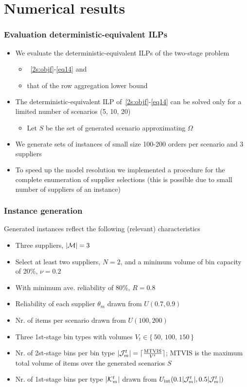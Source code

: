 \documentclass[9pt,xcolor={dvipsnames}]{beamer}
\begin{document}
\section {Numerical results}
\begin{frame}[allowframebreaks]
	\frametitle{Evaluation deterministic-equivalent ILPs}
	\begin{itemize}
		\item We evaluate the deterministic-equivalent ILPs of the two-stage problem
		\begin{itemize}
			\item~\eqref{2s:objf}-\eqref{eq14} and
			\item that of the row aggregation lower bound
		\end{itemize}
		\bigskip
		\item The deterministic-equivalent ILP of~\eqref{2s:objf}-\eqref{eq14} can be solved only for a limited number of scenarios (5, 10, 20)
		\begin{itemize}
			\footnotesize
			\item Let $ S$ be the set of generated scenario approximating $\Omega$
		\end{itemize}
		\bigskip
		\item We generate sets of instances of small size 100-200 orders per scenario and 3 suppliers
		\bigskip
		\item To speed up the model resolution we implemented a procedure for the complete enumeration of supplier selections (this is possible due to small number of suppliers of an instance)
	\end{itemize}
\end{frame}

\begin{frame}[allowframebreaks]
	\frametitle{Instance generation}
	Generated instances reflect the following (relevant) characteristics
	\begin{itemize}
		\footnotesize
		\medskip
		\item Three suppliers, $|{\cal M}| = 3$
		\medskip
		\item Select at least two suppliers, $N = 2$, and a minimum volume of bin capacity of 20\%, $\nu = 0.2$
		\medskip
		\item With minimum ave. reliability of 80\%, $R = 0.8$
		\medskip
		\item Reliability of each supplier $\theta_{m}$ drawn from $U(0.7, 0.9)$
		\medskip
		\item Nr. of items per scenario drawn from $U(100, 200)$
		\medskip
		\item Three 1st-stage bin types with volumes $ V_t \in \{ \, 50, \, 100, \, 150 \, \}$
		\medskip
		\item Nr. of 2st-stage bins per bin type $ | {\cal J}^t_m | = \lceil \frac{\text{MTVIS}}{V^t} \rceil $; MTVIS is the maximum total volume of items over the generated scenarios $ S$
		\medskip
		\item Nr. of 1st-stage bins per type $ | {\cal K}^t_m |$ drawn from $ U_{\text{int}}( 0.1 | {\cal J}^t_m |, 0.5 | {\cal J}^t_m |)$
	\end{itemize}
\end{frame}
\end{document}
